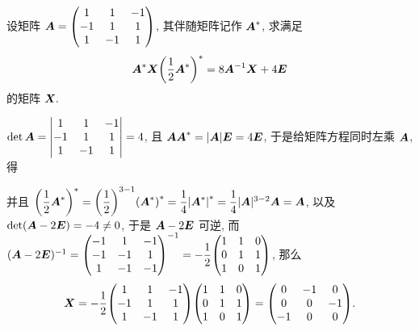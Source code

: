 \begin{example}
    设矩阵 $\vb*{A}=\mqty(1&1&-1\\-1&1&1\\1&-1&1)$, 其伴随矩阵记作 $\vb*{A}^*$, 求满足
    $$\vb*{A}^*\vb*{X}\qty(\dfrac{1}{2}\vb*{A}^*)^*=8\vb*{A}^{-1}\vb*{X}+4\vb*{E}$$ 的矩阵 $\vb*{X}.$
\end{example}
\begin{solution}
    $\det \vb*{A}=\mqty|1&1&-1\\-1&1&1\\1&-1&1|=4$, 且 $\vb*{A}\vb*{A}^*=|\vb*{A}|\vb*{E}=4\vb*{E}$, 于是给矩阵方程同时左乘 $\vb*{A}$, 得
    并且 $\qty(\dfrac{1}{2}\vb*{A}^*)^*=\qty(\dfrac{1}{2})^{3-1}\qty(\vb*{A}^*)^*=\dfrac{1}{4}\qty|\vb*{A}^*|^*=\dfrac{1}{4}|\vb*{A}|^{3-2}\vb*{A}=\vb*{A}$, 以及 $\det(\vb*{A}-2\vb*{E})= -4\neq0$, 于是 $\vb*{A}-2\vb*{E}$ 可逆, 
    而 $(\vb*{A}-2\vb*{E})^{-1}=\mqty(-1&1&-1\\-1&-1&1\\1&-1&-1)^{-1}=-\dfrac{1}{2}\mqty(1&1&0\\0&1&1\\1&0&1)$, 那么
    $$\vb*{X}=-\dfrac{1}{2}\mqty(1&1&-1\\-1&1&1\\1&-1&1)\mqty(1&1&0\\0&1&1\\1&0&1)=\mqty(0&-1&0\\0&0&-1\\-1&0&0).$$
\end{solution}

